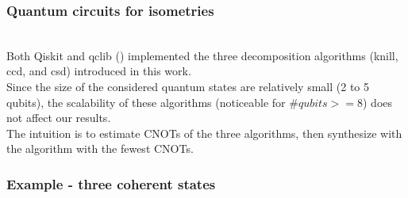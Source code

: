 \documentclass{beamer}
\begin{document}
\begin{frame}
    \frametitle{Quantum circuits for isometries}
    \cite{RN12}\\
    Both Qiskit and qclib (\cite{qclib}) implemented the three decomposition
    algorithms (knill, ccd, and csd) introduced in this work.\\
    Since the size of the considered quantum states are relatively small (2 to 5 qubits),
    the scalability of these algorithms (noticeable for $\# qubits >= 8$)
    does not affect our results.\\
    The intuition is to estimate CNOTs of the three algorithms, then
    synthesize with the algorithm with the fewest CNOTs.
\end{frame}

\begin{frame}
    \frametitle{Example - three coherent states}
    
\end{frame}
\end{document}
